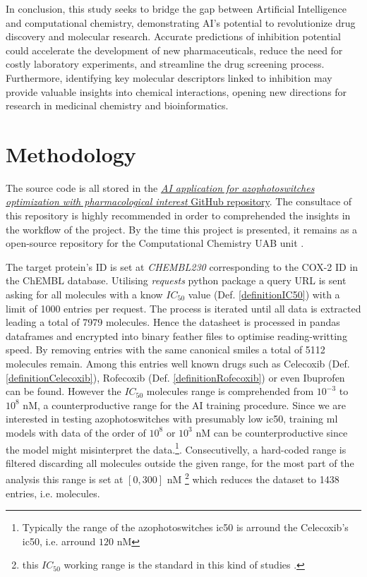 \documentclass[11pt]{article}
\begin{document}
In conclusion, this study seeks to bridge the gap between Artificial Intelligence and computational chemistry, demonstrating AI’s potential to revolutionize drug discovery and molecular research. Accurate predictions of inhibition potential could accelerate the development of new pharmaceuticals, reduce the need for costly laboratory experiments, and streamline the drug screening process. Furthermore, identifying key molecular descriptors linked to inhibition may provide valuable insights into chemical interactions, opening new directions for research in medicinal chemistry and bioinformatics.

\newpage
\section{Methodology}\label{sectionMethodology}
The source code is all stored in the \href{https://github.com/SirSergi0/Repository---AI-application-for-azophotoswitches-optimization-with-pharmacological-interest}{\emph{AI application for azophotoswitches optimization with pharmacological interest} GitHub repository}\cite{GitHub}. The consultace of this repository is highly recommended in order to comprehended the insights in the workflow of the project. By the time this project is presented, it remains as a open-source repository for the Computational Chemistry UAB unit \cite{UAB_ComputationalChemistry}.

The target protein's ID is set at \emph{CHEMBL230} corresponding to the COX-2 ID in the ChEMBL database\cite{ChemblDatabase}. Utilising \emph{requests} python package\cite{PythonPackageRequests} a query URL is sent asking for all molecules with a know $IC_{50}$ value (Def. \ref{definitionIC50}) with a limit of 1000 entries per request. The process is iterated until all data is extracted leading a total of 7979 molecules. Hence the datasheet is processed in pandas dataframes\cite{PythonPackagePandas} and encrypted into binary feather files to optimise reading-writting speed. By removing entries with the same canonical smiles a total of 5112 molecules remain. Among this entries well known drugs such as Celecoxib (Def. \ref{definitionCelecoxib}), Rofecoxib (Def. \ref{definitionRofecoxib}) or even Ibuprofen can be found. However the $IC_{50}$ molecules range is comprehended from $10^{-3}$ to $10^{8}$ nM, a counterproductive range for the AI training procedure. Since we are interested in testing azophotoswitches with presumably low \gls{ic50}, training \gls{ml} models with data of the order of $10^{8}$ or $10^{3}$ nM can be counterproductive since the model might misinterpret the data.\footnote{Typically the range of the azophotoswitches \gls{ic50} is arround the Celecoxib's \gls{ic50}, i.e. arround $120$ nM}. Consecutivelly, a hard-coded range is filtered discarding all molecules outside the given range, for the most part of the analysis this range is set at $[0,300]$ nM \footnote{this $IC_{50}$ working range is the standard in this kind of studies \cite{MachineLearningPaper5Lipoxygenase}.} which reduces the dataset to 1438 entries, i.e. molecules.
\end{document}
